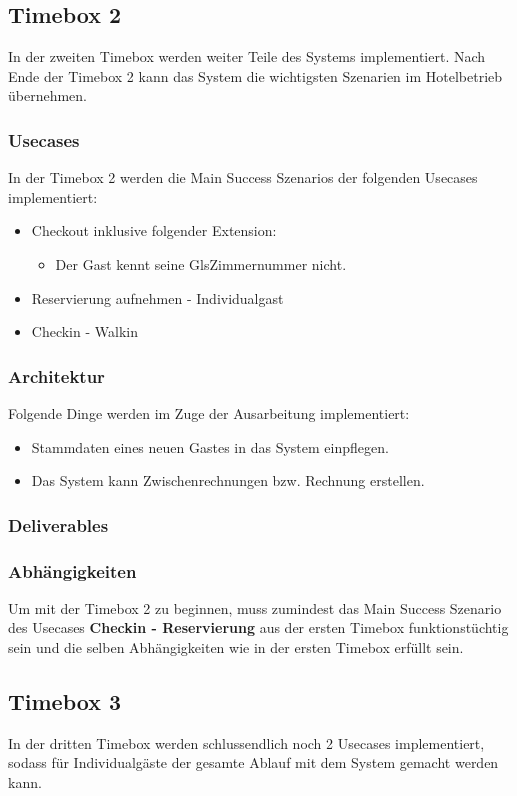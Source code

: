 \subsection{Timebox 2}
In der zweiten Timebox werden weiter Teile des Systems implementiert.
Nach Ende der Timebox 2 kann das System die wichtigsten Szenarien im Hotelbetrieb übernehmen.

\subsubsection{Usecases}
In der Timebox 2 werden die Main Success Szenarios der folgenden Usecases implementiert:

\begin{itemize}
	\item Checkout inklusive folgender Extension:
	\begin{itemize}
		\item Der \Gls{Gast} kennt seine Gls{Zimmernummer} nicht.
	\end{itemize}
	\item Reservierung aufnehmen - Individualgast
	\item Checkin - Walkin
\end{itemize}
\subsubsection{Architektur}
Folgende Dinge werden im Zuge der Ausarbeitung implementiert:

\begin{itemize}
	\item Stammdaten eines neuen \Gls{Gast}es in das System einpflegen.
	\item Das System kann Zwischenrechnungen bzw. Rechnung erstellen.
\end{itemize}

\subsubsection{Deliverables}
\subsubsection{Abhängigkeiten}
Um mit der Timebox 2 zu beginnen, muss zumindest das Main Success Szenario des Usecases \textbf{Checkin - Reservierung} aus der ersten Timebox funktionstüchtig sein
und die selben Abhängigkeiten wie in der ersten Timebox erfüllt sein.


\subsection{Timebox 3}
In der dritten Timebox werden schlussendlich noch 2 Usecases implementiert, sodass für Individualgäste der gesamte Ablauf mit dem System gemacht werden kann.

